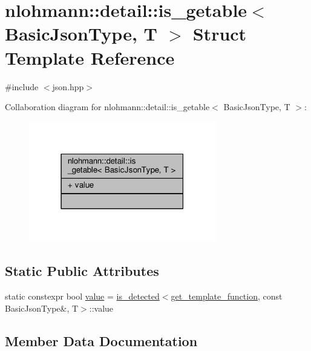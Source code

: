 \hypertarget{structnlohmann_1_1detail_1_1is__getable}{}\section{nlohmann\+:\+:detail\+:\+:is\+\_\+getable$<$ Basic\+Json\+Type, T $>$ Struct Template Reference}
\label{structnlohmann_1_1detail_1_1is__getable}


{\ttfamily \#include $<$json.\+hpp$>$}



Collaboration diagram for nlohmann\+:\+:detail\+:\+:is\+\_\+getable$<$ Basic\+Json\+Type, T $>$\+:
\nopagebreak
\begin{figure}[H]
\begin{center}
\leavevmode
\includegraphics[width=231pt]{structnlohmann_1_1detail_1_1is__getable__coll__graph}
\end{center}
\end{figure}
\subsection*{Static Public Attributes}
\begin{DoxyCompactItemize}
\item 
static constexpr bool \hyperlink{structnlohmann_1_1detail_1_1is__getable_a2150b5b5398683147928a61c99cd0070}{value} = \hyperlink{namespacenlohmann_1_1detail_a9135fcf616d6ac6e231a86e0a055ac44}{is\+\_\+detected}$<$\hyperlink{namespacenlohmann_1_1detail_ab4d22cdb6521ee3508db496dea66711e}{get\+\_\+template\+\_\+function}, const Basic\+Json\+Type\&, T$>$\+::value
\end{DoxyCompactItemize}


\subsection{Member Data Documentation}
